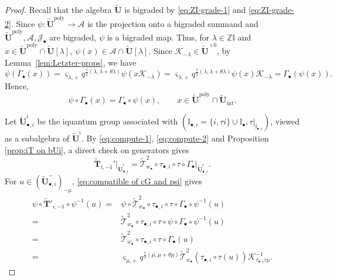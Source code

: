 \documentclass[a4paper,reqno,12pt]{amsart}
\numberwithin{equation}{section}
\theoremstyle{definition}
\theoremstyle{plain}
\theoremstyle{definition}
\def\Z{\mathbb Z}
\def\I{\mathbb I}
\def\bI{\I_\bullet}
\def\bIi{\I_{\bullet,i}}
\def\bw{w_\bullet}
\def\tU{\widetilde{\mathbf U}}
\def\tUi{\widetilde{\mathbf U}^{\imath}}
\def \tbiU{\tU_{\bullet,i}}
\def\tT{\widetilde{\mathscr T}}
\def\tTT{\widetilde{\mathbf T}}
\def\cA{\mathcal A}
\def\cJ{\mathcal J}
\def\cK{\mathcal K}
\def\vs{\varsigma}
\def\dm{\diamond}
\def \Gb{\Gamma_\bullet}
\newcommand{\tTa}[1]{\tTT'_{#1,-1}}
\newcommand{\poly}{\mathrm{poly}}
\begin{document}
\begin{proof}
Recall that the algebra $\tU$ is bigraded by \eqref{eq:ZI-grade-1} and \eqref{eq:ZI-grade-2}. Since $\psi:\tU^\poly\rightarrow\cA$ is the projection onto a bigraded summand and $\tU^\poly,\cA,\cJ_\bullet$ are bigraded, $\psi$ is a bigraded map. Thus, for $\lambda\in\Z\I$ and $x\in\tU^\poly\cap\tU[\lambda]$, $\psi(x)\in\cA\cap\tU[\lambda]$. Since $\cK_{-\lambda}\in\tU^{\imath 0}$, by Lemma~\ref{lem:Letzter-props}, we have
\begin{equation*}
    \psi(\Gb(x))=\vs_{\lambda,\dm}q^{\frac12(\lambda,\lambda+\theta\lambda)}\psi(x\cK_{-\lambda})=\vs_{\lambda,\dm}q^{\frac12(\lambda,\lambda+\theta\lambda)}
\psi(x)\cK_{-\lambda}=\Gb(\psi(x)).
\end{equation*}
 Hence,
 \begin{equation}\label{eq:compatible of cG and psi}
     \psi\circ\Gb(x)=\Gb\circ\psi(x),\qquad x\in\tU^\poly\cap\tU_{\text{int}}.
 \end{equation}
 
Let $\tbiU^\imath$ be the iquantum group  associated with $(\bIi=\{i,\tau i\}\cup\bI,\tau|_{\bIi})$, viewed as a subalgebra of $\tUi$. By \eqref{eq:compute-1}, \eqref{eq:compute-2} and Proposition \ref{prop:iT on bUi}, a direct check on generators gives
 \begin{equation}\label{eq:local-T}
     \tTT_{i,-1}'\big|_{\tbiU^\imath}=\tT_{\bw}^2\circ\tau_{\bullet,i}\circ\tau\circ\Gb\big|_{\tbiU^\imath}.
 \end{equation}
 For $u\in(\tbiU^-)_{-\mu}$, \eqref{eq:compatible of cG and psi} gives
 \begin{align*}
     \psi\circ\tTa{i}\circ\psi^{-1}(u)=&\psi\circ\tT_{\bw}^2\circ\tau_{\bullet,i}\circ\tau\circ\Gb\circ\psi^{-1}(u)\\
     =&\tT_{\bw}^2\circ\tau_{\bullet,i}\circ\tau\circ\psi\circ\Gb\circ\psi^{-1}(u)\\
     =&\tT_{\bw}^2\circ\tau_{\bullet,i}\circ\tau\circ\Gb(u)\\
     =&\vs_{\mu,\dm}q^{\frac12(\mu,\mu+\theta\mu)}\tT_{\bw}^2(\tau_{\bullet,i}\circ\tau(u))\cK_{\tau_{\bullet,i}\tau \mu}^{-1}.
 \end{align*}
\end{proof}
\end{document}
